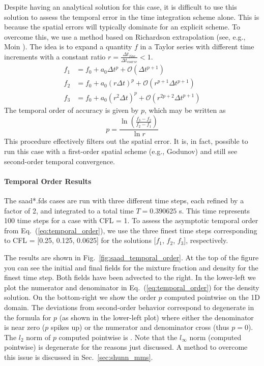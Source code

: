 \documentclass[11pt]{book}
\begin{document}
Despite having an analytical solution for this case, it is difficult to use this solution to assess the temporal error in the time integration scheme alone.  This is because the spatial errors will typically dominate for an explicit scheme.  To overcome this, we use a method based on Richardson extrapolation (see, e.g., Moin \cite{Moin:2001}).  The idea is to expand a quantity $f$ in a Taylor series with different time increments with a constant ratio $r = \frac{\Delta t_{fine}}{\Delta t_{coarse}} < 1$.
\begin{align}
f_1 &= f_0 + a_0 \Delta t^p + \mathcal{O}(\Delta t^{p+1}) \\
f_2 &= f_0 + a_0 (r \Delta t)^p + \mathcal{O}(r^{p+1} \Delta t^{p+1}) \\
f_3 &= f_0 + a_0 (r^2 \Delta t)^p + \mathcal{O}(r^{2p+2} \Delta t^{p+1})
\end{align}
The temporal order of accuracy is given by $p$, which may be written as
\begin{equation}
\label{eq:temporal_order}
p = \frac{\ln \left(\frac{f_3-f_2}{f_2-f_1}\right)}{\ln r}
\end{equation}
This procedure effectively filters out the spatial error.  It is, in fact, possible to run this case with a first-order spatial scheme (e.g., Godunov) and still see second-order temporal convergence.

\paragraph{Temporal Order Results} The {\ct saad*.fds} cases are run with three different time steps, each refined by a factor of 2, and integrated to a total time $T=0.390625$ s.  This time represents 100 time steps for a case with CFL = 1.  To assess the asymptotic temporal order from Eq.~(\ref{eq:temporal_order}), we use the three finest time steps corresponding to CFL = [0.25, 0.125, 0.0625] for the solutions [$f_1$, $f_2$, $f_3$], respectively.

The results are shown in Fig.~\ref{fig:saad_temporal_order}.  At the top of the figure you can see the initial and final fields for the mixture fraction and density for the finest time step.  Both fields have been advected to the right.  In the lower-left we plot the numerator and denominator in Eq.~(\ref{eq:temporal_order}) for the density solution.  On the bottom-right we show the order $p$ computed pointwise on the 1D domain. The deviations from second-order behavior correspond to degenerate in the formula for $p$ (as shown in the lower-left plot) where either the denominator is near zero ($p$ spikes up) or the numerator and denominator cross (thus $p=0$).  The $l_2$ norm of $p$ computed pointwise is \!.  Note that the $l_\infty$ norm (computed pointwise) is degenerate for the reasons just discussed.  A method to overcome this issue is discussed in Sec.~\ref{sec:shunn_mms}.
\end{document}
